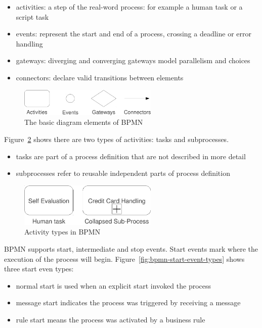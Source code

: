 \begin{itemize}
\item activities: a step of the real-word process: for example a human task or a script task
\item events: represent the start and end of a process, crossing a deadline or error handling
\item gateways: diverging and converging gateways model parallelism and choices
\item connectors: declare valid transitions between elements
\end{itemize}

\begin{figure}[H]
\centering
\includegraphics[width=250px,keepaspectratio]{bpmn-diagram-elements.pdf}
\caption{The basic diagram elements of BPMN}
\label{fig:bpmn-diagram-elements}
\end{figure}

Figure~\ref{fig:bpmn-activity-types} shows there are two types of activities: tasks and subprocesses.

\begin{itemize}
\item tasks are part of a process definition that are not described in more detail
\item subprocesses refer to reusable independent parts of process definition
\end{itemize}

\begin{figure}[H]
\centering
\includegraphics[width=250px,keepaspectratio]{bpmn-activity-types.pdf}
\caption{Activity types in BPMN}
\label{fig:bpmn-activity-types}
\end{figure}

BPMN supports start, intermediate and stop events. Start events mark where the
execution of the process will begin. Figure~\ref{fig:bpmn-start-event-types}
shows three start even types:

\begin{itemize}
\item normal start is used when an explicit start invoked the process
\item message start indicates the process was triggered by receiving a message
\item rule start means the process was activated by a business rule
\end{itemize}

